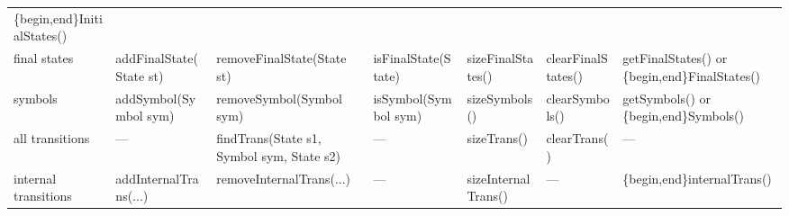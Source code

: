 \begin{sidewaystable}
\begin{threeparttable}
\begin{tabular}{p{0.75in}p{1.55in}p{1.6in}p{1.35in}p{1.27in}p{1.2in}p{1.5in}}
                                                                                                                                                                                             \{begin,end\}InitialStates() \\
final
\newline  states &  addFinalState(State st)                 &  removeFinalState(State st)               &  isFinalState(State)       &  sizeFinalStates()    &  clearFinalStates()        &  getFinalStates() or \newline
                                                                                                                                                                                             \{begin,end\}FinalStates()    \\
\hline %
symbols\tnote{2} &  addSymbol(Symbol sym)                   &  removeSymbol(Symbol sym)\tnote{5}        &  isSymbol(Symbol sym)      &  sizeSymbols()        &  clearSymbols()            &  getSymbols() or \newline
                                                                                                                                                                                             \{begin,end\}Symbols()         \\
\hline %
all \newline
transitions      &  ---                                     &  findTrans(State s1, \newline
                                                               \phantom{find}Symbol sym, State s2)&  ---                       &  sizeTrans()          &  clearTrans()              &  ---                           \\
internal \newline
transitions      &  addInternalTrans(\phantom{.}...\tnote{6}\phantom{a})
                                                            &  removeInternalTrans(\phantom{.}...\tnote{6}\phantom{a})
                                                                                                        &  ---                       &  sizeInternalTrans()  &  ---                       &  \{begin,end\}internalTrans()  \\

\end{tabular}
\end{threeparttable}
\end{sidewaystable}
